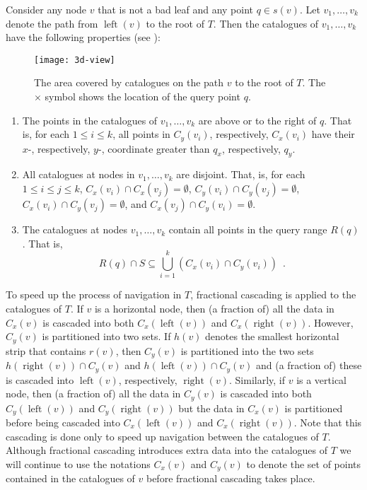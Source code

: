 \documentclass[lotsofwhite,charterfonts]{patmorin}
\DeclareMathOperator{\lft}{left}
\DeclareMathOperator{\rght}{right}
\begin{document}
Consider any node $v$ that is not a bad leaf and any point $q\in
s(v)$.  Let $v_1,\ldots,v_k$ denote the path from $\lft(v)$ to the
root of $T$.  Then the catalogues of $v_1,\ldots,v_k$ have the
following properties (see ):
\begin{figure}
  \begin{center}
    \texttt{[image: 3d-view]}
  \end{center}
  \caption{The area covered by catalogues on the path $v$ to the root
of $T$. The $\times$ symbol shows the location of the query point $q$.}
\end{figure}

\begin{enumerate}

\item The points in the catalogues of $v_1,\ldots,v_k$ are above or to
the right of $q$.  That is, for each $1\le i \le k$, all points in
$C_y(v_i)$, respectively, $C_x(v_i)$ have their $x$-, respectively,
$y$-, coordinate greater than $q_x$, respectively, $q_y$.

\item All catalogues at nodes in $v_1,\ldots,v_k$ are disjoint.  That,
is, for each $1\le i\le j \le k$,
$C_x(v_i)\cap C_x(v_j) = \emptyset$,
$C_y(v_i)\cap C_y(v_j) = \emptyset$,
$C_x(v_i)\cap C_y(v_j) = \emptyset$, and
$C_x(v_j)\cap C_y(v_i) = \emptyset$.

\item The catalogues at nodes $v_1,\ldots,v_k$ contain all points in
the query range $R(q)$.  That is,
\[
     R(q)\cap S \subseteq \bigcup_{i=1}^k \left(C_x(v_i)\cap C_y(v_i)\right)
        \enspace . 
\]
\end{enumerate}

%

To speed up the process of navigation in $T$, fractional cascading
\cite{ae76} is applied to the catalogues of $T$.  If $v$ is a
horizontal node, then (a fraction of) all the data in $C_x(v)$ is
cascaded into both $C_x(\lft(v))$ and $C_x(\rght(v))$.  However,
$C_y(v)$ is partitioned into two sets.  If $h(v)$ denotes the smallest
horizontal strip that contains $r(v)$, then $C_y(v)$ is
partitioned into the two sets $h(\rght(v))\cap C_y(v)$ and
$h(\lft(v))\cap C_y(v)$ and (a fraction of) these is cascaded into
$\lft(v)$, respectively, $\rght(v)$.  Similarly, if $v$ is a vertical
node, then (a fraction of) all the data in $C_y(v)$ is cascaded into
both $C_y(\lft(v))$ and $C_y(\rght(v))$ but the data in $C_x(v)$ is
partitioned before being cascaded into $C_x(\lft(v))$ and
$C_x(\rght(v))$.  Note that this cascading is done only to speed up
navigation between the catalogues of $T$.  Although fractional
cascading introduces extra data into the catalogues of $T$ we will
continue to use the notations $C_x(v)$ and $C_y(v)$ to denote the
set of points contained in the catalogues of $v$ before fractional
cascading takes place.
\end{document}
